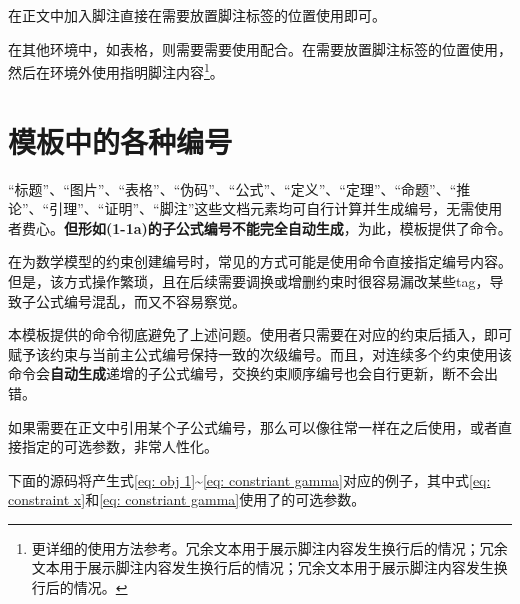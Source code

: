\documentclass[doctor, vlined]{DissertUESTC}
\begin{document}
	在正文中加入脚注直接在需要放置脚注标签的位置使用即可。
	
	在其他环境中，如表格，则需要需要使用配合。在需要放置脚注标签的位置使用，然后在环境外使用指明脚注内容\footnote{更详细的使用方法参考\href{https://blog.csdn.net/xovee/article/details/127563209}{\ttfamily\color{DarkRed}}。冗余文本用于展示脚注内容发生换行后的情况；冗余文本用于展示脚注内容发生换行后的情况；冗余文本用于展示脚注内容发生换行后的情况。}。
	
	
	\section{模板中的各种编号}
	
	“标题”、“图片”、“表格”、“伪码”、“公式”、“定义”、“定理”、“命题”、“推论”、“引理”、“证明”、“脚注”这些文档元素均可自行计算并生成编号，无需使用者费心。\textbf{但形如(1-1a)的子公式编号不能完全自动生成}，为此，模板提供了命令。

	在为数学模型的约束创建编号时，常见的方式可能是使用命令直接指定编号内容。但是，该方式操作繁琐，且在后续需要调换或增删约束时很容易漏改某些tag，导致子公式编号混乱，而又不容易察觉。

	本模板提供的命令彻底避免了上述问题。使用者只需要在对应的约束后插入，即可赋予该约束与当前主公式编号保持一致的次级编号。而且，对连续多个约束使用该命令会\textbf{自动生成}递增的子公式编号，交换约束顺序编号也会自行更新，断不会出错。
	
	如果需要在正文中引用某个子公式编号，那么可以像往常一样在之后使用，或者直接指定的可选参数，非常人性化。
	
	下面的源码将产生式\eqref{eq: obj 1}\textasciitilde \eqref{eq: constriant gamma}对应的例子，其中式\eqref{eq: constraint x}和\eqref{eq: constriant gamma}使用了的可选参数。
	
\end{document}
